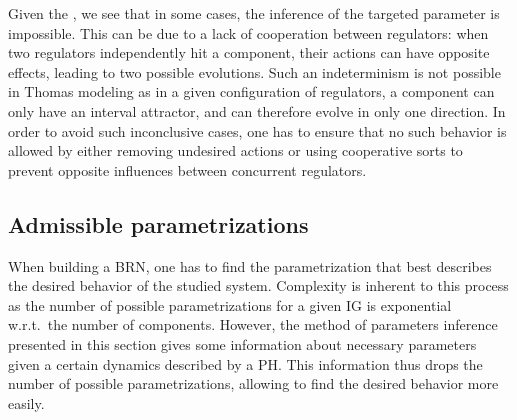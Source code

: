 

Given the , we see that in some cases, the inference of the targeted parameter is impossible.
This can be due to a lack of cooperation between regulators:
when two regulators independently hit a component, their actions can have opposite effects, leading to two possible evolutions.
Such an indeterminism is not possible in Thomas modeling as in a given configuration of regulators,
a component can only have an interval attractor, and can therefore evolve in only one direction.
In order to avoid such inconclusive cases, one has to ensure that no such behavior is allowed by
either removing undesired actions or using cooperative sorts to prevent opposite influences between
concurrent regulators.

\subsection{Admissible parametrizations}\label{ssec:admissible-K}

When building a BRN, one has to find the parametrization that best describes the desired behavior of the studied system.
Complexity is inherent to this process as the number of possible parametrizations for a given IG is exponential w.r.t.~the number of components.
However, the method of parameters inference presented in this section gives some information about necessary parameters given a certain dynamics described by a PH.
This information thus drops the number of possible parametrizations, allowing to find the desired behavior more easily.

